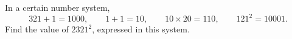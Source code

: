In a certain number system,
\[
321+1=1000,\qquad 1+1=10,\qquad 10\times20=110,\qquad 121^2=10001 .
\]
Find the value of $2321^2$, expressed in this system.

